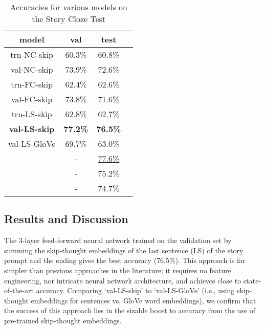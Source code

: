 \documentclass[11pt,a4paper]{article}
\begin{document}
\begin{table}[t!]
\begin{center}
\begin{tabular}{|c|c|c|c|}
\hline \bf model & \bf val & \bf test \\ \hline
trn-NC-skip & 60.3\% & 60.8\% \\
val-NC-skip & 73.9\% & 72.6\% \\ \hline
trn-FC-skip & 62.4\% & 62.6\% \\
val-FC-skip & 73.8\% & 71.6\% \\ \hline
trn-LS-skip & 62.8\% & 62.7\% \\
{\bf val-LS-skip} & {\bf 77.2\%} & {\bf 76.5\%} \\
val-LS-GloVe & 69.7\% & 63.0\% \\ \hline
\citet{Chaturvedi2017StoryCF} & - & \underline{77.6\%} \\
\citet{schwartz2017story} & - & 75.2\% \\
\citet{Cai2017PayAT} & - & 74.7\%\\
\hline
\end{tabular}
\end{center}
\caption{\label{results} Accuracies for various models on the Story Cloze Test}
\end{table}

















\subsection{Results and Discussion}

The 3-layer feed-forward neural network trained on the validation set by summing the skip-thought embeddings of the last sentence (LS) of the story prompt and the ending gives the best accuracy ($76.5\%$). This approach is far simpler than previous approaches in the literature; it requires no feature engineering, nor intricate neural network architecture, and achieves close to state-of-the-art accuracy. Comparing `val-LS-skip' to `val-LS-GloVe' (i.e., using skip-thought embeddings for sentences vs. GloVe word embeddings), we confirm that the success of this approach lies in the sizable boost to accuracy from the use of pre-trained skip-thought embeddings.
\end{document}
